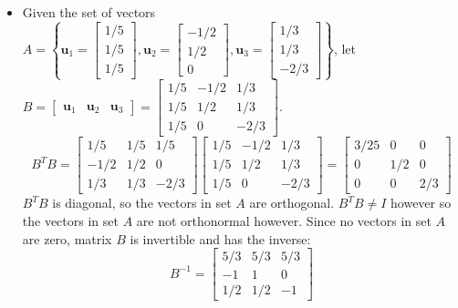 \documentclass{article}
\begin{document}
\begin{itemize}
\item Given the set of vectors \(A = \left\{\mathbf{u}_1 = \begin{bmatrix} 1/5 \\ 1/5 \\ 1/5 \end{bmatrix}, \mathbf{u}_2 = \begin{bmatrix} -1/2 \\ 1/2 \\ 0 \end{bmatrix}, \mathbf{u}_3 = \begin{bmatrix} 1/3 \\ 1/3 \\ -2/3 \end{bmatrix}\right\}\), let \(B = \begin{bmatrix} \mathbf{u}_1 & \mathbf{u}_2 & \mathbf{u}_3 \end{bmatrix} = \begin{bmatrix} 1/5 & -1/2 & 1/3 \\ 1/5 & 1/2 & 1/3 \\ 1/5 & 0 & -2/3 \end{bmatrix}\). 
\[B^T B = \begin{bmatrix} 1/5 & 1/5 & 1/5 \\ -1/2 & 1/2 & 0 \\ 1/3 & 1/3 & -2/3 \end{bmatrix}\begin{bmatrix} 1/5 & -1/2 & 1/3 \\ 1/5 & 1/2 & 1/3 \\ 1/5 & 0 & -2/3 \end{bmatrix} = \begin{bmatrix} 3/25 & 0 & 0 \\ 0 & 1/2 & 0 \\ 0 & 0 & 2/3 \end{bmatrix}\]
\(B^T B\) is diagonal, so the vectors in set \(A\) are orthogonal. \(B^T B \neq I\) however so the vectors in set \(A\) are not orthonormal however. Since no vectors in set \(A\) are zero, matrix \(B\) is invertible and has the inverse:
\[B^{-1} = \begin{bmatrix} 5/3 & 5/3 & 5/3 \\ -1 & 1 & 0 \\ 1/2 & 1/2 & -1 \end{bmatrix}\]

\end{itemize}
\end{document}
